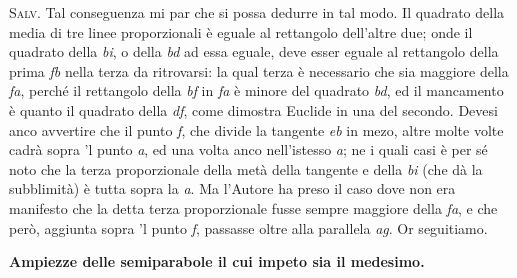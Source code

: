 \documentclass[11pt,twoside,openany]{book}
\newcommand{\speaker}[1]{\textcolor{rubric}{\textsc{#1}}\space}
\begin{document}
\speaker{Salv.} Tal conseguenza mi par che si possa dedurre in tal modo. Il quadrato della media di tre linee proporzionali è eguale al rettangolo dell'altre due; onde il quadrato della \emph{bi}, o della \emph{bd} ad essa eguale, deve esser eguale al rettangolo della prima \emph{fb} nella terza da ritrovarsi: la qual terza è necessario che sia maggiore della \emph{fa}, perché il rettangolo della \emph{bf} in \emph{fa} è minore del quadrato \emph{bd}, ed il mancamento è quanto il quadrato della \emph{df}, come dimostra Euclide in una del secondo. Devesi anco avvertire che il punto \emph{f}, che divide la tangente \emph{eb} in mezo, altre molte volte cadrà sopra 'l punto \emph{a}, ed una volta anco nell'istesso \emph{a}; ne i quali casi è per sé noto che la terza proporzionale della metà della tangente e della \emph{bi} (che dà la subblimità) è tutta sopra la \emph{a}. Ma l'Autore ha preso il caso dove non era manifesto che la detta terza proporzionale fusse sempre maggiore della \emph{fa}, e che però, aggiunta sopra 'l punto \emph{f}, passasse oltre alla parallela \emph{ag}. Or seguitiamo.


\begin{center}
\textbf{Ampiezze delle semiparabole il cui impeto sia il medesimo.}
\end{center}
\end{document}

